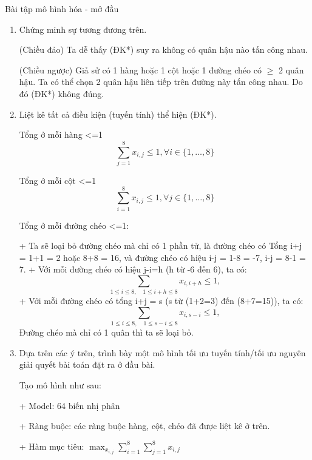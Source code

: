 \begin{exercise}{3}{Bài tập mô hình hóa - mở đầu}
\begin{solution}
\begin{enumerate}[label=(\alph*)]
    Tiếp theo ta quan tâm tới điều kiện quan trọng nhất của bài toán - không có hai quân hậu nào
tấn công nhau. Bằng suy luận toán học, ta có thể chứng minh rằng điều này tương đương với
điều kiện 
    \begin{constraint}
       (ĐK*) Mỗi hàng, mỗi cột, mỗi đường chéo của bàn cờ chỉ có tối đa một quân hậu.
    \end{constraint}
\item Chứng minh sự tương đương trên.
   \begin{answer}
    (Chiều đảo) Ta dễ thấy (ĐK*) suy ra không có quân hậu nào tấn công nhau.

    (Chiều ngược) Giả sử có 1 hàng hoặc 1 cột hoặc 1 đường chéo có $\geq$ 2 quân hậu.
     Ta có thể chọn
    2 quân hậu liên tiếp trên đường này tấn công nhau. Do đó (ĐK*) không đúng.
   \end{answer}
\item Liệt kê tất cả điều kiện (tuyến tính) thể hiện (ĐK*).
  \begin{answer}
    Tổng ở mỗi hàng <=1
    \begin{equation*}
        \sum_{j=1}^8 x_{i,j} \leq 1, \forall i \in \{1,\dots, 8\}
    \end{equation*}

    Tổng ở mỗi cột <=1
    \begin{equation*}
        \sum_{i=1}^8 x_{i,j} \leq 1, \forall j \in \{1,\dots, 8\}
    \end{equation*}
    
    Tổng ở mỗi đường chéo  <=1:

      + Ta sẽ loại bỏ đường chéo mà chỉ có 1 phần tử, là đường chéo có Tổng
         i+j = 1+1 = 2 hoặc 8+8 = 16, và đường chéo có hiệu i-j = 1-8 = -7,
         i-j = 8-1 = 7.
      + Với mỗi đường chéo có hiệu j-i=h (h từ -6 đến 6), ta có:
    \begin{equation*}
        \sum_{1\leq i \leq 8, \quad
         1\leq i+h \leq 8 } x_{i, i+h} \leq 1,
    \end{equation*}
      + Với mỗi đường chéo có tổng i+j = s (s từ (1+2=3) đến (8+7=15)), ta có:
    \begin{equation*}
        \sum_{1\leq i \leq 8, \quad
         1\leq s-i \leq 8 } x_{i, s-i} \leq 1,
    \end{equation*}
       Đường chéo mà chỉ có 1 quân thì ta sẽ loại bỏ.
  \end{answer}
   \item Dựa trên các ý trên, trình bày một mô hình tối ưu tuyến tính/tối ưu nguyên giải quyết bài
   toán đặt ra ở đầu bài.
   \begin{answer} Tạo mô hình như sau:
    
     + Model: 64 biến nhị phân

     + Ràng buộc: các ràng buộc hàng, cột, chéo đã được liệt kê ở trên.

     + Hàm mục tiêu:  $\max_{x_{i,j}}\sum_{i=1}^8\sum_{j=1}^8 x_{i,j}$

   \end{answer}
\end{enumerate}
\end{solution}
\end{exercise}